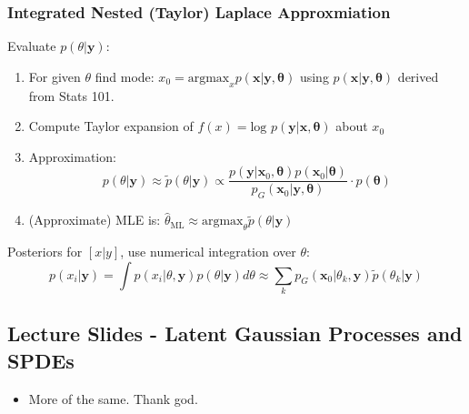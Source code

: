 \documentclass{article}
\begin{document}
\subsubsection*{Integrated Nested (Taylor) Laplace Approxmiation}
Evaluate $p(\theta|\pmb{y})$:
\begin{enumerate}
\item For given $\theta$ find mode: $x_{0} = \text{argmax}_{x}p(\pmb{x} | \pmb{y}, \pmb{\theta})$ using $p(\pmb{x} | \pmb{y}, \pmb{\theta})$ derived from Stats 101.
\item Compute Taylor expansion of $f(x) = \text{log } p(\pmb{y} | \pmb{x}, \pmb{\theta})$ about $x_{0}$
\item Approximation:
$$ p(\theta|\pmb{y}) \approx \tilde{p}(\theta|\pmb{y}) \propto  \frac{p(\pmb{y} | \pmb{x}_{0}, \pmb{\theta}) p(\pmb{x}_{0} | \pmb{\theta})}{p_{G}(\pmb{x}_{0} | \pmb{y}, \pmb{\theta})} \cdot p(\pmb{\theta})$$
\item (Approximate) MLE is: $\hat{\theta}_{\text{ML}} \approx \text{argmax}_{\theta} \tilde{p}(\theta|\pmb{y})$
\end{enumerate}
Posteriors for $[x | y]$, use numerical integration over $\theta$:
$$ p(x_{i}|\pmb{y}) = \int p(x_{i}|\theta, \pmb{y})p(\theta|\pmb{y})d\theta \approx \sum_{k} p_{G}(\pmb{x}_{0} | \theta_{k}, \pmb{y}) \tilde{p}(\theta_{k}|\pmb{y})$$



\subsection*{Lecture Slides - Latent Gaussian Processes and SPDEs}
\citep{Lindstrom2016}
\begin{itemize}
\item More of the same. Thank god.
\end{itemize}
\end{document}
